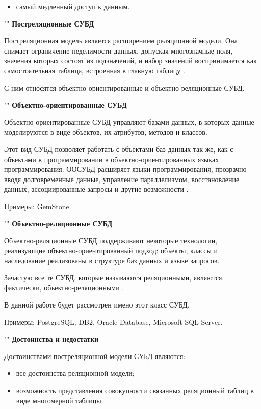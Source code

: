 \documentclass[a4paper]{bmstu}
\begin{document}
\begin{itemize}
	\item самый медленный доступ к данным.
\end{itemize}

""\newline
\noindent\textbf{Постреляционные СУБД}

Постреляционная модель является расширением реляционной модели. Она снимает ограничение неделимости данных, допуская многозначные поля, значения которых состоят из подзначений, и набор значений воспринимается как самостоятельная таблица, встроенная в главную таблицу \cite{post-rel}.

С ним относятся объектно-ориентированные и объектно-реляционные СУБД.

""\newline
\noindent\textbf{Объектно-ориентированные СУБД}

Объектно-ориентированные СУБД управляют базами данных, в которых данные моделируются в виде объектов, их атрибутов, методов и классов.

Этот вид СУБД позволяет работать с объектами баз данных так же, как с объектами в программировании в объектно-ориентированных языках программирования. ООСУБД расширяет языки программирования, прозрачно вводя долговременные данные, управление параллелизмом, восстановление данных, ассоциированные запросы и другие возможности \cite{dbms}.

Примеры: GemStone.

""\newline
\noindent\textbf{Объектно-реляционные СУБД}

Объектно-реляционные СУБД поддерживают некоторые технологии, реализующие объектно-ориентированный подход: объекты, классы и наследование реализованы в структуре баз данных и языке запросов.

Зачастую все те СУБД, которые называются реляционными, являются, фактически, объектно-реляционными \cite{dbms}.

В данной работе будет рассмотрен имено этот класс СУБД.

Примеры: PostgreSQL, DB2, Oracle Database, Microsoft SQL Server.

""\newline
\noindent\textbf{Достоинства и недостатки}

Достоинствами постреляционной модели СУБД являются:

\begin{itemize}
	\item все достоинства реляционной модели;
	\item возможность представления совокупности связанных реляционный таблиц в виде многомерной таблицы.
\end{itemize}
\end{document}
